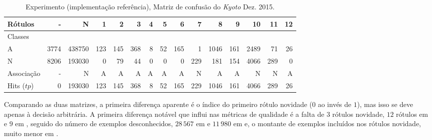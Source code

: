 \begin{table}[hbt]%
  {\footnotesize
  \begin{center}
  \caption{Experimento  (implementação referência), Matriz de confusão do \dataset \emph{Kyoto} Dez. 2015.}
  \label{tab:java-matrix}
  \begin{tabular}{l *{14}{|r} }
    Rótulos   &     - &       N &    1 &    2 &    3 &  4 &   5 &    6 &    7 &     8 &    9 &    10 &   11 &  12 \\\hline
    Classes  &       &         &      &      &      &    &     &      &      &       &      &       &      &     \\\hline
    \hline
    A        &  3774 &  438750 &  123 &  145 &  368 &  8 &  52 &  165 &    1 &  1046 &  161 &  2489 &   71 &  26 \\\hline
    N        &  8206 &  193030 &    0 &   79 &   44 &  0 &   0 &    0 &  229 &   181 &  154 &  4066 &  289 &   0 \\\hline
    \hline
    Associação &     - &       N &    A &    A &    A &  A &   A &    A &    N &     A &    A &     N &    N &   A \\\hline
    Hits ($tp$)     &     0 &  193030 &  123 &  145 &  368 &  8 &  52 &  165 &  229 &  1046 &  161 &  4066 &  289 &  26 
  \end{tabular}
\end{center}
}
\end{table}

Comparando as duas matrizes, a primeira diferença aparente é o índice do
primeiro rótulo novidade ($0$ ao invés de $1$), mas isso se deve apenas à decisão
arbitrária.
A primeira diferença notável que influi nas métricas de qualidade é a falta de
3 rótulos novidade, $12$ rótulos em  e $9$ em \serial,
seguido do número de exemplos desconhecidos, $28\,567$ em \serial e $11\,980$ em
 e, o montante de exemplos incluídos nos rótulos novidade, muito menor
em \serial.

